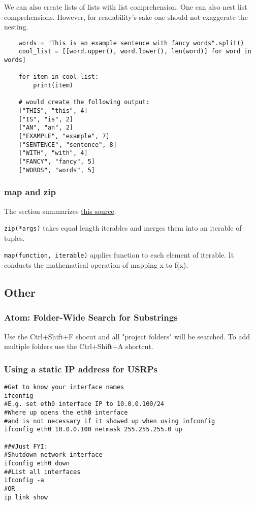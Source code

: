 \documentclass{article}
\begin{document}
We can also create lists of lists with list comprehension. One can also nest list comprehensions. However, for readability's sake one should not exaggerate the nesting.

\begin{verbatim}
	words = "This is an example sentence with fancy words".split()
	cool_list = [[word.upper(), word.lower(), len(word)] for word in words]
	
	for item in cool_list:
		print(item)
	
	# would create the following output:
	["THIS", "this", 4]
	["IS", "is", 2]
	["AN", "an", 2]
	["EXAMPLE", "example", 7]
	["SENTENCE", "sentence", 8]
	["WITH", "with", 4]
	["FANCY", "fancy", 5]
	["WORDS", "words", 5]
\end{verbatim}

\subsubsection{map and zip}

The section summarizes \href{https://bradmontgomery.net/blog/pythons-zip-map-and-lambda/}{this source}.

\bigskip

\texttt{zip(*args)} takes equal length iterables and merges them into an iterable of tuples.

\bigskip

\texttt{map(function, iterable)} applies function to each element of iterable. It conducts the mathematical operation of mapping x to f(x). 

\subsection{Other}

\subsubsection{Atom: Folder-Wide Search for Substrings}
Use the Ctrl+Shift+F shocut and all "project folders" will be searched. To add multiple folders use the Ctrl+Shift+A shortcut.

\subsubsection{Using a static IP address for USRPs}
\begin{verbatim}
#Get to know your interface names
ifconfig 
#E.g. set eth0 interface IP to 10.0.0.100/24
#Where up opens the eth0 interface 
#and is not necessary if it showed up when using infconfig
ifconfig eth0 10.0.0.100 netmask 255.255.255.0 up

###Just FYI:
#Shutdown network interface
ifconfig eth0 down
##List all interfaces
ifconfig -a
#OR
ip link show
\end{verbatim}
\end{document}
